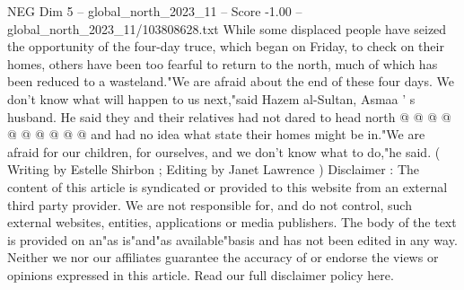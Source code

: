 \begin{textsample}{NEG Dim 5 – global\_north\_2023\_11 – Score -1.00 – global\_north\_2023\_11/103808628.txt}
While some displaced people have seized the opportunity of the four-day truce, which began on Friday, to check on their homes, others have been too fearful to return to the north, much of which has been reduced to a wasteland."We are afraid about the end of these four days.
We don't know what will happen to us next,"said Hazem al-Sultan, Asmaa ' s husband.
He said they and their relatives had not dared to head north @ @ @ @ @ @ @ @ @ @ and had no idea what state their homes might be in."We are afraid for our children, for ourselves, and we don't know what to do,"he said. ( Writing by Estelle Shirbon ; Editing by Janet Lawrence ) Disclaimer : The content of this article is syndicated or provided to this website from an external third party provider.
We are not responsible for, and do not control, such external websites, entities, applications or media publishers.
The body of the text is provided on an"as is"and"as available"basis and has not been edited in any way.
Neither we nor our affiliates guarantee the accuracy of or endorse the views or opinions expressed in this article.
Read our full disclaimer policy here.

\end{textsample}
